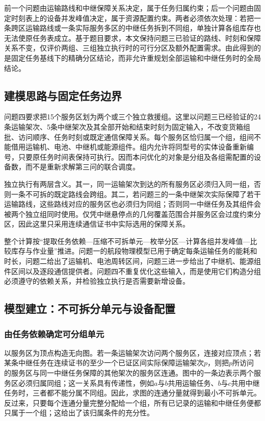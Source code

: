 \documentclass[bwprint,fontset=fandol]{gmcmthesis}
\begin{document}
前一个问题由运输路线和中继保障关系决定，属于任务归属约束；后一个问题由固定时刻表上的设备并发峰值决定，属于资源配置约束。两者必须依次处理：若把一条跨区运输路线或一条实际服务多区的中继任务拆到不同组，单独计算各组库存也无法使原任务表成立。基于题目要求，本文保持问题三已验证的路线、时刻和保障关系不变，仅评价两组、三组独立执行时的可行分区及额外配置需求。由此得到的是固定任务基线下的精确分区结论，而非允许重规划全部运输和中继任务时的全局结论。

\subsection{建模思路与固定任务边界}
问题四要求把15个服务区划为两个或三个独立救援组。这里以问题三已经验证的24条运输架次、5条中继架次及其全部开始和结束时刻为固定输入，不改变货箱组批、访问顺序、任务时刻或既定通信保障关系。每个服务区恰归属一个组，组间不能借用运输机、电池、中继机或能源组件。组内允许将同型号的实体设备重新编号，只要原任务时间表保持可执行。因而本问优化的对象是分组及各组需配置的设备数，而不是重新求解第三问的联合调度。

独立执行有两层含义。其一，同一运输架次到达的所有服务区必须归入同一组，否则一条不可拆的既定路线会跨组。其二，若问题三的一条中继架次实际保障了若干运输路线，这些路线对应的服务区也必须归为同组；否则同一中继任务及其组件会被两个独立组同时使用。仅凭中继悬停点的几何覆盖范围合并服务区会过度约束分区，因此这里只采用连续通信证书中实际选用的保障关系。

整个计算按“提取任务依赖—压缩不可拆单元—枚举分区—计算各组并发峰值—比较库存与作业量”推进。问题一的航段物理模型已用于确定每条运输任务的能耗和时长，问题二给出了运输机、电池周转区间，问题三进一步给出了中继机、能源组件区间以及逐段通信提供者。问题四不重复优化这些输入，而是使用它们构造分组必须遵守的依赖关系，并检验独立执行是否需要新增设备。

\subsection{模型建立：不可拆分单元与设备配置}
\subsubsection{由任务依赖确定可分组单元}
以服务区为顶点构造无向图。若一条运输架次访问两个服务区，连接对应顶点；若某条中继任务在连续证书的至少一个已证区间实际保障运输架次$p$，则把$p$所访问的服务区与同一中继任务保障的其他架次的服务区连通。图中的一条边表示两个服务区必须归属同组；这一关系具有传递性，例如$a$与$b$共用运输任务、$b$与$c$共用中继任务时，三者都不能分属不同组。因此，求图的连通分量就得到最小不可拆单元。反过来，只要每个连通分量完整分配给一个组，所有已记录的运输和中继任务便都只属于一个组；这给出了该归属条件的充分性。
\end{document}
